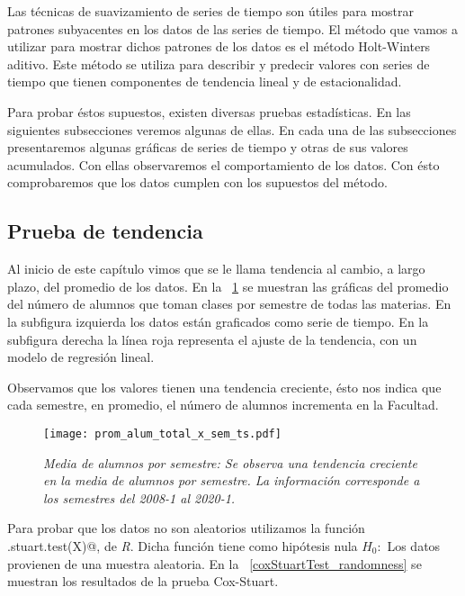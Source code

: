 Las técnicas de suavizamiento de series de tiempo son útiles para mostrar patrones subyacentes en los datos de las series de tiempo. El método que vamos a utilizar para mostrar dichos patrones de los datos es el método Holt-Winters aditivo. Este método se utiliza para describir y predecir valores con series de tiempo que tienen componentes de tendencia lineal y de estacionalidad.

Para probar éstos supuestos, existen diversas pruebas estadísticas. En las siguientes subsecciones veremos algunas de ellas. En cada una de las subsecciones presentaremos algunas gráficas de series de tiempo y otras de sus valores acumulados. Con ellas observaremos el comportamiento de los datos. Con ésto comprobaremos que los datos cumplen con los supuestos del método.


\subsection{Prueba de tendencia}

Al inicio de este capítulo vimos que se le llama tendencia al cambio, a largo plazo, del promedio de los datos. En la \figurename{~\ref{prom_alum_x_sem_ts}} se muestran las gráficas del promedio del número de alumnos que toman clases por semestre de todas las materias. En la subfigura izquierda los datos están graficados como serie de tiempo. En la subfigura derecha la línea roja representa el ajuste de la tendencia, con un modelo de regresión lineal.

Observamos que los valores tienen una tendencia creciente, ésto nos indica que cada semestre, en promedio, el número de alumnos incrementa en la Facultad.

\begin{figure}[H]
\centering
\texttt{[image: prom\_alum\_total\_x\_sem\_ts.pdf]} %
\caption[\textit{Media de alumnos por semestre}]{\textit{Media de alumnos por semestre: Se observa una tendencia creciente en la media de alumnos por semestre. La información corresponde a los semestres del 2008-1 al 2020-1.}}\label{prom_alum_x_sem_ts}
\end{figure}

Para probar que los datos no son aleatorios utilizamos la función \verb@cox.stuart.test(X)@, de \textit{R}. Dicha función tiene como hipótesis nula $H_{0}:$ Los datos provienen de una muestra aleatoria. En la \figurename{~\ref{coxStuartTest_randomness}} se muestran los resultados de la prueba Cox-Stuart.

